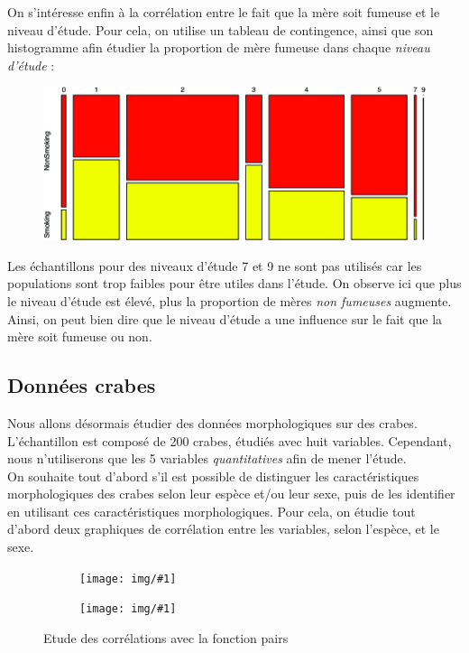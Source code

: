 \documentclass[a4paper,11pt]{article}
\newcommand{\InsertFig}[1]{
\begin{figure}[H]
\begin{center}
\texttt{[image: img/\#1]}
\end{center}
\end{figure}}
\begin{document}
\noindent On s'intéresse enfin à la corrélation entre le fait que la mère soit fumeuse et le niveau d'étude. Pour cela, on utilise un tableau de contingence, ainsi que son histogramme afin étudier la proportion de mère fumeuse dans chaque \textit{niveau d'étude} : \\

\begin{figure}[H]
\begin{center}
\includegraphics[width=.6\textwidth]{img/histo.jpg}
\end{center}
\end{figure}

\noindent Les échantillons pour des niveaux d'étude 7 et 9 ne sont pas utilisés car les populations sont trop faibles pour être utiles dans l'étude. On observe ici que plus le niveau d'étude est élevé, plus la proportion de mères \textit{non fumeuses} augmente. Ainsi, on peut bien dire que le niveau d'étude a une influence sur le fait que la mère soit fumeuse ou non.

\subsection{Données crabes}

\noindent Nous allons désormais étudier des données morphologiques sur des crabes. L'échantillon est composé de 200 crabes, étudiés avec huit variables. Cependant, nous n'utiliserons que les 5 variables \textit{quantitatives} afin de mener l'étude. \\

\noindent On souhaite tout d'abord s'il est possible de distinguer les caractéristiques morphologiques des crabes selon leur espèce et/ou leur sexe, puis de les identifier en utilisant ces caractéristiques morphologiques.
\noindent Pour cela, on étudie tout d'abord deux graphiques de corrélation entre les variables, selon l'espèce, et le sexe.

\begin{figure}[H]

  \begin{minipage}[b]{0.45\linewidth}
   \centering
   \InsertFig{pairs1.png} 
  \end{minipage}
\hfill
  \begin{minipage}[b]{0.45\linewidth}
   \centering
  \InsertFig{pairs2.png}     
  \end{minipage}

  \caption{Etude des corrélations avec la fonction pairs}
  \label{fig:ma_fig}

\end{figure}
\end{document}
